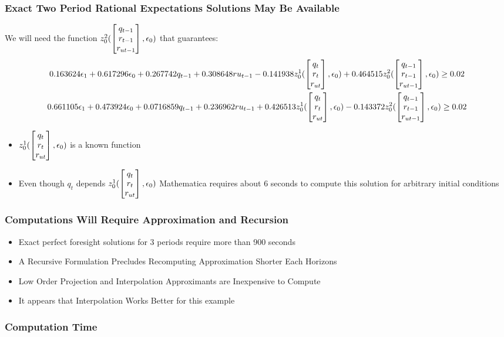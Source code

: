 \documentclass{beamer}
\begin{document}
    \begin{frame}
\frametitle{Exact Two Period Rational Expectations Solutions May Be Available}

We will need the function {\small $z_0^2(\begin{bmatrix} q_{t-1}\\r_{t-1}\\r_{ut-1} \end{bmatrix},\epsilon_0)$ }that guarantees:
{\tiny 
\begin{gather*}
 0.163624 \epsilon_{1}+  0.617296 \epsilon_0+0.267742 q_{t-1}+0.308648 ru_{t-1}-0.141938
      z_0^1(\begin{bmatrix} q_t\\r_{t}\\r_{ut} \end{bmatrix},\epsilon_0)+0.464515 z_0^2(\begin{bmatrix} q_{t-1}\\r_{t-1}\\r_{ut-1} \end{bmatrix},\epsilon_0) \ge 0.02\\  
    0.661105 \epsilon_{1}+    0.473924 \epsilon_0+0.0716859 q_{t-1}+0.236962 ru_{t-1}+0.426513
      z_0^1(\begin{bmatrix} q_t\\r_{t}\\r_{ut} \end{bmatrix},\epsilon_0)-0.143372 z_0^2(\begin{bmatrix} q_{t-1}\\r_{t-1}\\r_{ut-1} \end{bmatrix},\epsilon_0)  \ge 0.02 \\
\end{gather*}
}
\begin{itemize}
\item {\small $z_0^1(\begin{bmatrix} q_t\\r_{t}\\r_{ut} \end{bmatrix},\epsilon_0)$ } is a known function
\item Even though $q_t$ depends {\small $z_0^1(\begin{bmatrix} q_t\\r_{t}\\r_{ut} \end{bmatrix},\epsilon_0)$ } Mathematica requires about 6 seconds to compute this solution for arbitrary initial conditions
\end{itemize}
    \end{frame}
    \begin{frame}
      \frametitle{Computations Will Require Approximation and
        Recursion}
      \begin{itemize}
      \item Exact perfect foresight solutions for 3 periods require more than 900 seconds
      \item A Recursive Formulation Precludes Recomputing Approximation Shorter Each Horizons
      \item Low Order Projection and Interpolation Approximants are Inexpensive to Compute
      \item It appears that Interpolation Works Better for this example
      \end{itemize}
    \end{frame}



   \begin{frame}
     \frametitle{Computation Time}


{\tiny
     \begin{minipage}{1.0\linewidth}
     
     \end{minipage}
}
   \end{frame}
\end{document}
